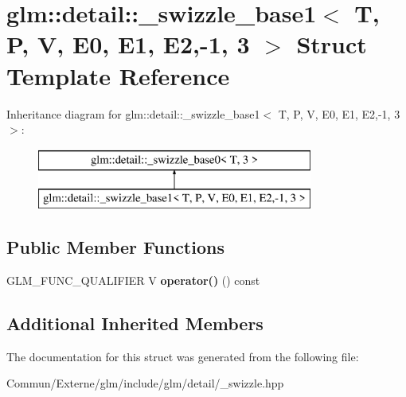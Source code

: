 \hypertarget{structglm_1_1detail_1_1__swizzle__base1_3_01_t_00_01_p_00_01_v_00_01_e0_00_01_e1_00_01_e2_00-1_00_013_01_4}{}\section{glm\+:\+:detail\+:\+:\+\_\+swizzle\+\_\+base1$<$ T, P, V, E0, E1, E2,-\/1, 3 $>$ Struct Template Reference}
\label{structglm_1_1detail_1_1__swizzle__base1_3_01_t_00_01_p_00_01_v_00_01_e0_00_01_e1_00_01_e2_00-1_00_013_01_4}
Inheritance diagram for glm\+:\+:detail\+:\+:\+\_\+swizzle\+\_\+base1$<$ T, P, V, E0, E1, E2,-\/1, 3 $>$\+:\begin{figure}[H]
\begin{center}
\leavevmode
\includegraphics[height=2.000000cm]{structglm_1_1detail_1_1__swizzle__base1_3_01_t_00_01_p_00_01_v_00_01_e0_00_01_e1_00_01_e2_00-1_00_013_01_4}
\end{center}
\end{figure}
\subsection*{Public Member Functions}
\begin{DoxyCompactItemize}
\item 
G\+L\+M\+\_\+\+F\+U\+N\+C\+\_\+\+Q\+U\+A\+L\+I\+F\+I\+ER V {\bfseries operator()} () const \hypertarget{structglm_1_1detail_1_1__swizzle__base1_3_01_t_00_01_p_00_01_v_00_01_e0_00_01_e1_00_01_e2_00-1_00_013_01_4_a94510ce33bf6a19e28b4f95f4e715807}{}\label{structglm_1_1detail_1_1__swizzle__base1_3_01_t_00_01_p_00_01_v_00_01_e0_00_01_e1_00_01_e2_00-1_00_013_01_4_a94510ce33bf6a19e28b4f95f4e715807}

\end{DoxyCompactItemize}
\subsection*{Additional Inherited Members}


The documentation for this struct was generated from the following file\+:\begin{DoxyCompactItemize}
\item 
Commun/\+Externe/glm/include/glm/detail/\+\_\+swizzle.\+hpp\end{DoxyCompactItemize}
